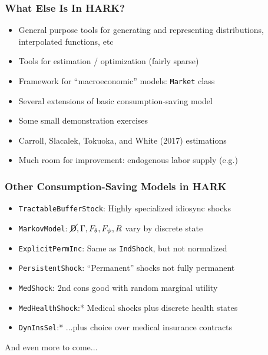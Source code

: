 \documentclass[11ptt]{beamer}
\newcommand{\Die}{\mathsf{D}}
\newcommand{\Live}{\cancel{\Die}}
\begin{document}
\begin{frame}
\frametitle{What Else Is In HARK?}

\begin{itemize}
\item <1->General purpose tools for generating and representing distributions, interpolated functions, etc

\item <1->Tools for estimation / optimization (fairly sparse)

\item <2->Framework for ``macroeconomic'' models: \texttt{Market} class

\item <3->Several extensions of basic consumption-saving model

\item <4->Some small demonstration exercises

\item <4->Carroll, Slacalek, Tokuoka, and White (2017) estimations

\item <5->Much room for improvement: endogenous labor supply (e.g.)

\end{itemize}

\end{frame}



\begin{frame}
\frametitle{Other Consumption-Saving Models in HARK}
\begin{itemize}
\item <1->\texttt{TractableBufferStock}: Highly specialized idiosync shocks

\item <2->\texttt{MarkovModel}: $\Live,\Gamma,F_\theta,F_\psi,R$ vary by discrete state

\item <3->\texttt{ExplicitPermInc}: Same as \texttt{IndShock}, but not normalized

\item <3->\texttt{PersistentShock}: ``Permanent'' shocks not fully permanent

\item <4->\texttt{MedShock}: 2nd cons good with random marginal utility

\item <5->\texttt{MedHealthShock}:* Medical shocks plus discrete health states

\item <5->\texttt{DynInsSel}:* ...plus choice over medical insurance contracts
\end{itemize}
And even more to come...
\end{frame}
\end{document}

